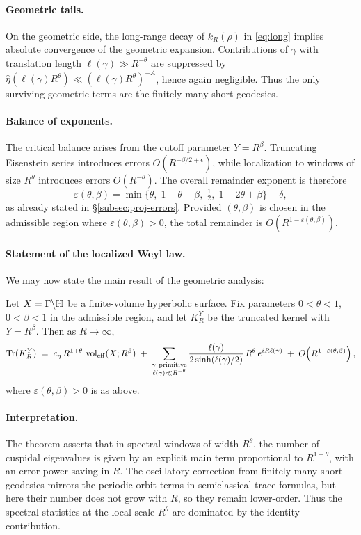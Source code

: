 \paragraph{Geometric tails.}
On the geometric side, the long-range decay of $k_R(\rho)$ in \eqref{eq:long} implies absolute convergence of the geometric expansion. Contributions of $\gamma$ with translation length $\ell(\gamma)\gg R^{-\theta}$ are suppressed by $\widehat{\eta}(\ell(\gamma)R^\theta)\ll (\ell(\gamma)R^\theta)^{-A}$, hence again negligible. Thus the only surviving geometric terms are the finitely many short geodesics.

\paragraph{Balance of exponents.}
The critical balance arises from the cutoff parameter $Y=R^\beta$. Truncating Eisenstein series introduces errors $O(R^{-\beta/2+\epsilon})$, while localization to windows of size $R^\theta$ introduces errors $O(R^{-\theta})$. The overall remainder exponent is therefore
\[
\varepsilon(\theta,\beta) = \min\{\theta,\;1-\theta+\beta,\;\tfrac12,\;1-2\theta+\beta\}-\delta,
\]
as already stated in \S\ref{subsec:proj-errors}. Provided $(\theta,\beta)$ is chosen in the admissible region where $\varepsilon(\theta,\beta)>0$, the total remainder is $O(R^{1-\varepsilon(\theta,\beta)})$.

\paragraph{Statement of the localized Weyl law.}
We may now state the main result of the geometric analysis:

\begin{theorem}\label{thm:weyl}
Let $X=\Gamma\backslash\mathbb{H}$ be a finite-volume hyperbolic surface. Fix parameters $0<\theta<1$, $0<\beta<1$ in the admissible region, and let $K_R^Y$ be the truncated kernel with $Y=R^\beta$. Then as $R\to\infty$,
\[
\mathrm{Tr}(K_R^Y) \;=\; c_\eta \, R^{1+\theta} \,\operatorname{vol}_{\mathrm{eff}}(X;R^\beta) 
\;+\; \sum_{\substack{\gamma\ \mathrm{primitive}\\ \ell(\gamma)\ll R^{-\theta}}} 
\frac{\ell(\gamma)}{2\sinh(\ell(\gamma)/2)} \, R^\theta \, e^{iR\ell(\gamma)}
\;+\; O\!\left(R^{1-\varepsilon(\theta,\beta)}\right),
\]
where $\varepsilon(\theta,\beta)>0$ is as above. 
\end{theorem}

\paragraph{Interpretation.}
The theorem asserts that in spectral windows of width $R^\theta$, the number of cuspidal eigenvalues is given by an explicit main term proportional to $R^{1+\theta}$, with an error power-saving in $R$. The oscillatory correction from finitely many short geodesics mirrors the periodic orbit terms in semiclassical trace formulas, but here their number does not grow with $R$, so they remain lower-order. Thus the spectral statistics at the local scale $R^\theta$ are dominated by the identity contribution.

